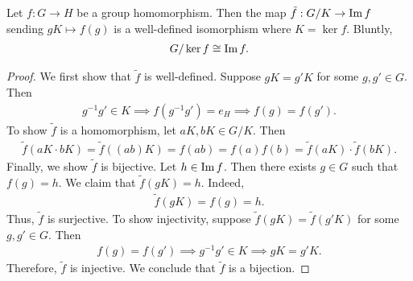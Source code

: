 \begin{theorem}
    Let $f:G \to H$ be a group homomorphism. Then the map $\tilde{f}:G/K \to \operatorname{Im} f$ sending $gK \mapsto f(g)$ is a well-defined isomorphism where $K = \ker f$. Bluntly,
    \begin{align}
        G/\ker f \cong \operatorname{Im} f.
    \end{align}
\end{theorem}
\begin{proof}
    We first show that $\tilde{f}$ is well-defined. Suppose $gK = g'K$ for some $g,g' \in G$. Then
    \begin{align}
        g^{-1}g' \in K \implies f(g^{-1}g') = e_{H} \implies f(g) = f(g').
    \end{align}
    To show $\tilde{f}$ is a homomorphism, let $aK,bK \in G/K$. Then
    \begin{align}
        \tilde{f}(aK \cdot bK) = \tilde{f}((ab)K) = f(ab) = f(a)f(b) = \tilde{f}(aK) \cdot \tilde{f}(bK).
    \end{align}
    Finally, we show $\tilde{f}$ is bijective. Let $h \in \operatorname{Im} f$. Then there exists $g \in G$ such that $f(g) = h$. We claim that $\tilde{f}(gK) = h$. Indeed,
    \begin{align}
        \tilde{f}(gK) = f(g) = h.
    \end{align}
    Thus, $\tilde{f}$ is surjective. To show injectivity, suppose $\tilde{f}(gK) = \tilde{f}(g'K)$ for some $g,g' \in G$. Then
    \begin{align}
        f(g) = f(g') \implies g^{-1}g' \in K \implies gK = g'K.
    \end{align}
    Therefore, $\tilde{f}$ is injective. We conclude that $\tilde{f}$ is a bijection.
\end{proof}